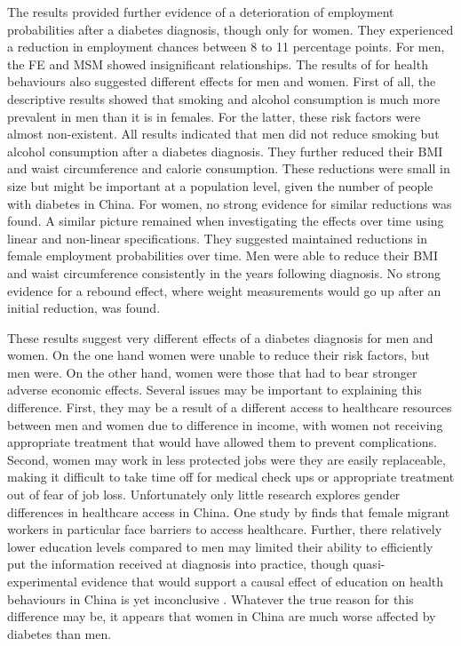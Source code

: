 The results provided further evidence of a deterioration of employment probabilities after a diabetes diagnosis, though only for women. They experienced a reduction in employment chances between 8 to 11 percentage points. For men, the \ac{FE} and \ac{MSM} showed insignificant relationships. The results of for health behaviours also suggested different effects for men and women. First of all, the descriptive results showed that smoking and alcohol consumption is much more prevalent in men than it is in females. For the latter, these risk factors were almost non-existent. All results indicated that men did not reduce smoking but alcohol consumption after a diabetes diagnosis. They further reduced their \ac{BMI} and waist circumference and calorie consumption. These reductions were small in size but might be important at a population level, given the number of people with diabetes in China. For women, no strong evidence for similar reductions was found. A similar picture remained when investigating the effects over time using linear and non-linear specifications. They suggested maintained reductions in female employment probabilities over time. Men were able to reduce their \ac{BMI} and waist circumference consistently in the years following diagnosis. No strong evidence for a rebound effect, where weight measurements would go up after an initial reduction, was found. 

These results suggest very different effects of a diabetes diagnosis for men and women. On the one hand women were unable to reduce their risk factors, but men were. On the other hand, women were those that had to bear stronger adverse economic effects. Several issues may be important to explaining this difference. First, they may be a result of a different access to healthcare resources between men and women due to difference in income, with women not receiving appropriate treatment that would have allowed them to prevent complications. Second, women may work in less protected jobs were they are easily replaceable, making it difficult to take time off for medical check ups or appropriate treatment out of fear of job loss. Unfortunately only little research explores gender differences in healthcare access in China. One study by \textcite{Fan2013} finds that female migrant workers in particular face barriers to access healthcare. Further, there relatively lower education levels compared to men may limited their ability to efficiently put the information received at diagnosis into practice, though quasi-experimental evidence that would support a causal effect of education on health behaviours in China is yet inconclusive \parencite{Xie2014a}. Whatever the true reason for this difference may be, it appears that women in China are much worse affected by diabetes than men.

